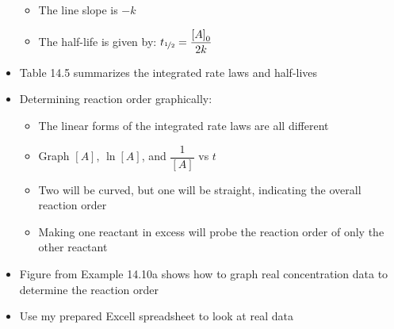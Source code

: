 \documentclass[12pt, openany, letterpaper]{memoir}
\begin{document}
\begin{itemize}
\begin{itemize}
		\item The line slope is $-k$
		\item The half-life is given by: $t_{\nicefrac{1}{2}}=\dfrac{\left[A\right]_0}{2k}$ 
	\end{itemize}
	\item Table 14.5 summarizes the integrated rate laws and half-lives
	\item Determining reaction order graphically:
	\begin{itemize}
		\item The linear forms of the integrated rate laws are all different
		\item Graph $\left[A\right]$, $\ln \left[A\right]$, and $\dfrac{1}{\left[A\right]}$ vs $t$
		\item Two will be curved, but one will be straight, indicating the overall reaction order
		\item Making one reactant in excess will probe the reaction order of only the other reactant
	\end{itemize}
	\item Figure from Example 14.10a shows how to graph real concentration data to determine the reaction order
	\item Use my prepared Excell spreadsheet to look at real data
\end{itemize}
\end{document}
